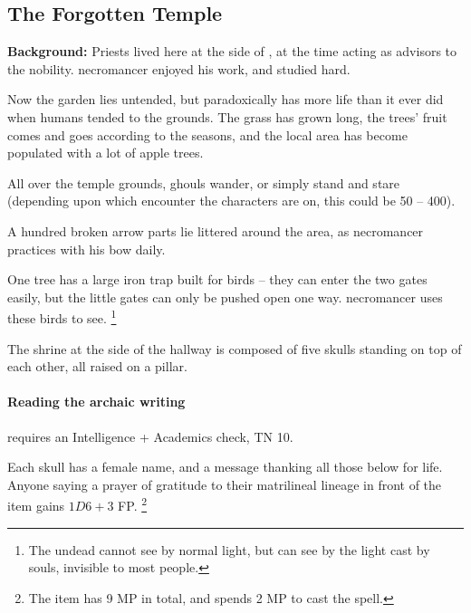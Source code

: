 \subsection[Forgotten Temple]{The Forgotten Temple}\label{necromancers_lair}


\textbf{Background:}
Priests lived here at the side of , at the time acting as advisors to the nobility.
\Gls{necromancer} enjoyed his work, and studied hard.

Now the garden lies untended, but paradoxically has more life than it ever did when humans tended to the grounds.
The grass has grown long, the trees' fruit comes and goes according to the seasons, and the local area has become populated with a lot of apple trees.


All over the temple grounds, ghouls wander, or simply stand and stare
(depending upon which encounter the characters are on, this could be 50 -- 400).

A hundred broken arrow parts lie littered around the area, as \gls{necromancer} practices with his bow daily.

One tree has a large iron trap built for birds -- they can enter the two gates easily, but the little gates can only be pushed open one way.
\Gls{necromancer} uses these birds to see.%
\footnote{The undead cannot see by normal light, but can see by the light cast by souls, invisible to most people.}



The shrine at the side of the hallway is composed of five skulls standing on top of each other, all raised on a pillar.

\paragraph{Reading the archaic writing}
requires an Intelligence + Academics check, TN 10.

Each skull has a female name, and a message thanking all those below for life.
Anyone saying a prayer of gratitude to their matrilineal lineage in front of the item gains $1D6+3$ FP.%
\footnote{The item has 9 MP in total, and spends 2 MP to cast the spell.}


